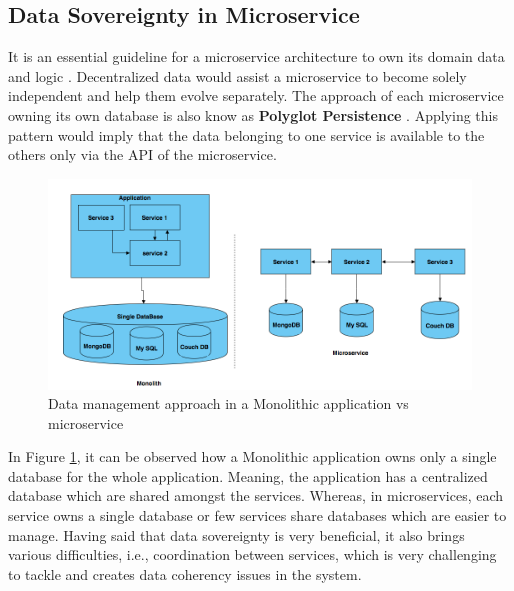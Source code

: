     \newpage
    \subsection{Data Sovereignty in Microservice}
    \label{subsection:dataSovereignty}
    It is an essential guideline for a microservice architecture to own its domain data and 
    logic \cite[p.~29]{Torre2017}. Decentralized data would assist a microservice
    to become solely independent and help them evolve separately. The approach of each microservice owning its own database is also
    know as \textbf{Polyglot Persistence} \cite{Polyglot}. Applying this pattern would imply that the
    data belonging to one service is available to the others only via the API of the microservice.

    \begin{figure}[H]
        \centering \includegraphics[scale=0.4]{grafiken/polyglot.png}
        \caption{Data management approach in a Monolithic application vs microservice \cite{FowlerMartin}}
        \label{fig:polyglot}
    \end{figure}
    
   In Figure \ref{fig:polyglot}, it can be observed how a Monolithic application owns only a single database for the whole application. Meaning,
   the application has a centralized database which are shared amongst the services. Whereas, in microservices, each service owns
   a single database or few services share databases which are easier to manage. Having said that data sovereignty is very beneficial, it also brings various difficulties,
   i.e., coordination between services, which is very challenging to tackle and creates data coherency issues in the system. 




